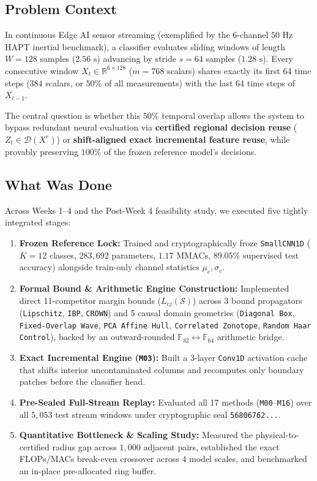 \documentclass[11pt,a4paper]{article}
\newcommand{\R}{\mathbb{R}}
\newcommand{\F}{\mathbb{F}}
\newcommand{\code}[1]{{\small\ttfamily\nolinkurl{#1}}}
\newcommand{\Sset}{\mathcal{S}}
\newcommand{\Dset}{\mathcal{D}}
\begin{document}
\subsection{Problem Context}
In continuous Edge AI sensor streaming (exemplified by the 6-channel $50\text{ Hz}$ HAPT inertial benchmark), a classifier evaluates sliding windows of length $W = 128$ samples ($2.56\text{ s}$) advancing by stride $s = 64$ samples ($1.28\text{ s}$). Every consecutive window $X_t \in \R^{6 \times 128}$ ($m = 768$ scalars) shares exactly its first 64 time steps ($384$ scalars, or $50\%$ of all measurements) with the last 64 time steps of $X_{t-1}$.

The central question is whether this $50\%$ temporal overlap allows the system to bypass redundant neural evaluation via \textbf{certified regional decision reuse} ($Z_t \in \Dset(X^r)$) or \textbf{shift-aligned exact incremental feature reuse}, while provably preserving $100\%$ of the frozen reference model's decisions.

\subsection{What Was Done}
Across Weeks 1--4 and the Post-Week 4 feasibility study, we executed five tightly integrated stages:
\begin{enumerate}
  \item \textbf{Frozen Reference Lock:} Trained and cryptographically froze \code{SmallCNN1D} ($K=12$ classes, $283,692$ parameters, $1.17\text{ MMACs}$, $89.05\%$ supervised test accuracy) alongside train-only channel statistics $\mu_c, \sigma_c$.
  \item \textbf{Formal Bound \& Arithmetic Engine Construction:} Implemented direct 11-competitor margin bounds ($L_{cj}(\Sset)$) across 3 bound propagators (\code{Lipschitz}, \code{IBP}, \code{CROWN}) and 5 causal domain geometries (\code{Diagonal Box}, \code{Fixed-Overlap Wave}, \code{PCA Affine Hull}, \code{Correlated Zonotope}, \code{Random Haar Control}), backed by an outward-rounded $\F_{32} \leftrightarrow \F_{64}$ arithmetic bridge.
  \item \textbf{Exact Incremental Engine (\code{M03}):} Built a 3-layer \code{Conv1D} activation cache that shifts interior uncontaminated columns and recomputes only boundary patches before the classifier head.
  \item \textbf{Pre-Sealed Full-Stream Replay:} Evaluated all 17 methods (\code{M00}--\code{M16}) over all $5,053$ test stream windows under cryptographic seal \code{56806762...}.
  \item \textbf{Quantitative Bottleneck \& Scaling Study:} Measured the physical-to-certified radius gap across $1,000$ adjacent pairs, established the exact FLOPs/MACs break-even crossover across 4 model scales, and benchmarked an in-place pre-allocated ring buffer.
\end{enumerate}
\end{document}
